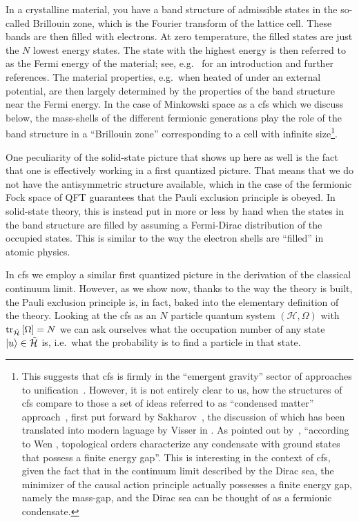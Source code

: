 \documentclass[reqno,11pt]{amsart}
\renewcommand{\H}{\mathcal{H}}
\numberwithin{equation}{section}
\begin{document}
In a crystalline material, you have a band structure of admissible states in the so-called Brillouin zone, which is the
Fourier transform of the lattice cell.
These bands are then filled with electrons.
At zero temperature, the filled states are just the $N$ lowest energy states.
The state with the highest energy is then referred to as the Fermi energy of the material; see, e.g.~\cite{solidstate,sigrist2013solid,wen2004quantum} for an introduction and further references.
The material properties, e.g.~when heated of under an external potential, are then largely determined by the properties
of the band structure near the Fermi energy.
In the case of Minkowski space as a \ac{cfs} which we discuss below, the mass-shells of the different fermionic generations
play the role of the band structure in a ``Brillouin zone'' corresponding to a cell with infinite size\footnote{This suggests that \ac{cfs} is firmly in the ``emergent gravity'' sector of approaches to unification~\cite{crowther2019renormalizability}. However, it is not entirely clear to us, how the structures of \ac{cfs} compare to those a set of ideas referred to as ``condensed matter'' approach~\cite{bain2014three}, first put forward by Sakharov~\cite{sakharov2000vacuum}, the discussion of which has been translated into modern laguage by Visser in \cite{visser2002sakharov}. As pointed out by~\cite{bain2014three}, ``according to Wen \cite[p.341]{wen2004quantum}, topological orders characterize 
any condensate with ground states that possess a finite energy gap''. This is interesting in the context of \ac{cfs}, given the fact that in the continuum limit described by the Dirac sea, the minimizer of the causal action principle actually possesses a finite energy gap, namely the mass-gap, and the Dirac sea can be thought of as a fermionic condensate.}.

One peculiarity of the solid-state picture that shows up here as well is the fact that one is effectively working in a
first quantized picture.
That means that we do not have the antisymmetric structure available, which in the case of the fermionic Fock space of QFT
guarantees that the Pauli exclusion principle is obeyed.
In solid-state theory, this is instead put in more or less by hand when the states in the band structure are filled by
assuming a Fermi-Dirac distribution of the occupied states.
This is similar to the way the electron shells are ``filled'' in atomic physics.

In \ac{cfs} we employ a similar first quantized picture in the derivation of the classical continuum limit.
However, as we show now, thanks to the way the theory is built, the Pauli exclusion principle is, in fact, baked into the
elementary definition of the theory.
Looking at the \ac{cfs} as an $N$ particle quantum system $(\H, \Omega)$ with $ \tr_{\tilde{\H}} \left[ \Omega \right] = N$ we can
ask ourselves what the occupation number of any state $\ket{u} \in \tilde{\H}$ is, i.e.~what the probability is to find a
particle in that state.
\end{document}
